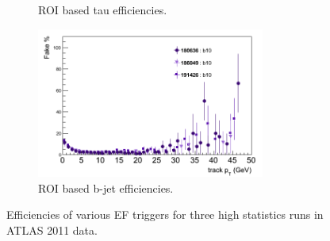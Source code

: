 \begin{figure}[htbp]
\begin{subfigure}{.5\linewidth}
		\caption{ROI based tau efficiencies.}
		\label{fig:trig_2011_EF_pt_e}
	\end{subfigure}
	\begin{subfigure}{.5\linewidth}	
		\centering
		\includegraphics[width=75mm]{f/b10_IDTrkNoCut_pT_EF_fake}
		\caption{ROI based b-jet efficiencies.}
		\label{fig:trig_2011_EF_pt_g}
	\end{subfigure}
	\caption{Efficiencies of various EF triggers for three high statistics runs in ATLAS 2011 data.}
	\label{fig:trig_2011_EF_pt}
\end{figure}

\clearpage


